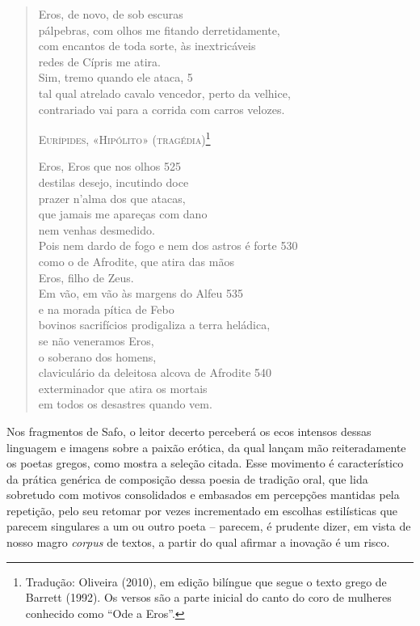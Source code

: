 \begin{quote}
\smallskip

Eros, de novo, de sob escuras\\
pálpebras, com olhos me fitando derretidamente,\\ %
com encantos de toda sorte, às inextricáveis\\
redes de Cípris me atira.\\ %
Sim, tremo quando ele ataca, \num{5}\\
tal qual atrelado cavalo vencedor, perto da velhice,\\
contrariado vai para a corrida com carros velozes.

\bigskip

{\centering
\textsc{Eurípides, «Hipólito» (tragédia)}\footnote{ Tradução: Oliveira (2010), em
edição bilíngue que segue o texto grego de Barrett (1992). Os versos são a parte inicial do canto do coro de mulheres conhecido como ``Ode a Eros''.}
\par}

\smallskip

Eros, Eros que nos olhos \num{525}\\
destilas desejo, incutindo doce\\ 
prazer n’alma dos que atacas,\\
que jamais me apareças com dano\\
nem venhas desmedido.\\
Pois nem dardo de fogo e nem dos astros é forte \num{530}\\
como o de Afrodite, que atira das mãos\\
Eros, filho de Zeus.\\
Em vão, em vão às margens do Alfeu \num{535}\\[5pt]
e na morada pítica de Febo\\
bovinos sacrifícios prodigaliza a terra heládica,\\
se não veneramos Eros,\\
o soberano dos homens,\\
claviculário da deleitosa alcova de Afrodite \num{540}\\
exterminador que atira os mortais\\
em todos os desastres quando vem.
\end{quote}

Nos fragmentos de Safo, o leitor decerto perceberá os ecos intensos
dessas linguagem e imagens sobre a paixão erótica, da qual lançam mão
reiteradamente os poetas gregos, como mostra a seleção citada. Esse movimento é
característico da prática genérica de composição dessa poesia de tradição oral, que lida sobretudo com motivos consolidados e embasados em
percepções mantidas pela repetição, pelo seu retomar por vezes incrementado em
escolhas estilísticas que parecem singulares a um ou outro poeta -- parecem, é
prudente dizer, em vista de nosso magro \textit{corpus} de textos, a partir do
qual afirmar a inovação é um risco.

